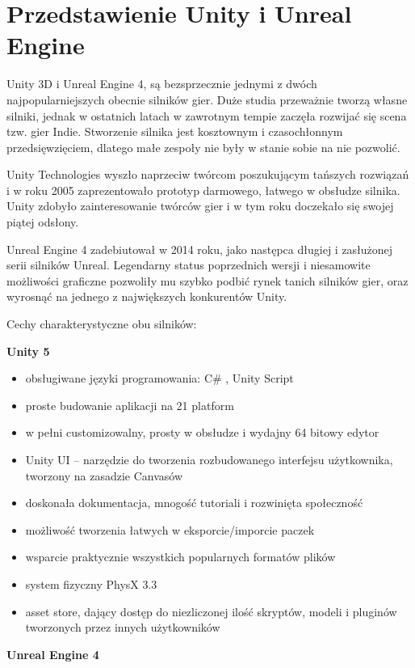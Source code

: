 \documentclass[brudnopis]{xmgr}
\begin{document}
\chapter{Przedstawienie Unity i Unreal Engine}

Unity 3D i Unreal Engine 4, są bezsprzecznie jednymi z dwóch najpopularniejszych obecnie silników gier. Duże studia przeważnie tworzą własne silniki, jednak  w ostatnich latach w zawrotnym tempie zaczęła rozwijać się scena tzw. gier Indie. Stworzenie silnika jest kosztownym i czasochłonnym przedsięwzięciem, dlatego małe zespoły nie były w stanie sobie na nie pozwolić. 

Unity Technologies wyszło naprzeciw twórcom poszukującym tańszych rozwiązań i w roku 2005 zaprezentowało prototyp darmowego, łatwego w obsłudze silnika. Unity zdobyło zainteresowanie twórców gier i w tym roku doczekało się swojej piątej odsłony.

Unreal Engine 4 zadebiutował w 2014 roku, jako następca długiej i zasłużonej serii silników Unreal. Legendarny status poprzednich wersji i niesamowite możliwości graficzne pozwoliły mu szybko podbić rynek tanich silników gier, oraz wyrosnąć na jednego z największych konkurentów Unity.

Cechy charakterystyczne obu silników:

\textbf{Unity 5}

	\begin{itemize}
	\item obsługiwane języki programowania: C\# , Unity Script
	\item proste budowanie aplikacji na 21 platform
	\item w pełni customizowalny, prosty w obsłudze  i wydajny 64 bitowy edytor
	\item Unity UI – narzędzie do tworzenia rozbudowanego interfejsu użytkownika, tworzony na zasadzie Canvasów
	\item doskonała dokumentacja, mnogość tutoriali  i rozwinięta społeczność
	\item możliwość tworzenia łatwych w eksporcie/imporcie paczek
	\item wsparcie praktycznie wszystkich popularnych formatów plików
	\item system fizyczny PhysX 3.3
	\item asset store, dający dostęp do niezliczonej ilość skryptów, modeli i pluginów tworzonych przez innych użytkowników
\end{itemize}

\textbf{Unreal Engine 4}
\end{document}
